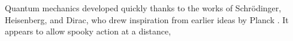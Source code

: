 \documentclass[11pt]{article}\usepackage[paperwidth=14cm,paperheight=7cm,left=1cm,right=3.6cm,top=1cm,bottom=1cm,marginparwidth=2.6cm,marginparsep=3mm]{geometry}\pagestyle{empty}
\begin{document}
Quantum mechanics developed quickly thanks to the works of Schr\"odinger, Heisenberg, and Dirac, who drew inspiration from earlier ideas by Planck . It appears to allow spooky action at a distance,  
\end{document}
